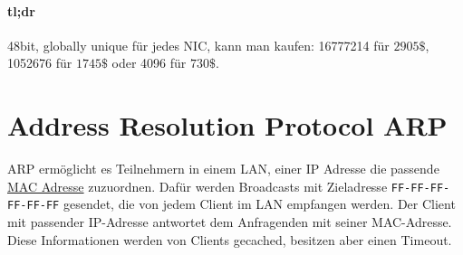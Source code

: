 \paragraph{tl;dr}
48bit, globally unique für jedes NIC, kann man kaufen: 16777214 für $2905\$$, 1052676 für $1745\$$ oder 4096 für $730\$$.

\section{Address Resolution Protocol ARP}
ARP ermöglicht es Teilnehmern in einem LAN, einer IP Adresse die passende \hyperref[sec:mac-address]{MAC Adresse} zuzuordnen. Dafür werden Broadcasts mit Zieladresse \lstinline{FF-FF-FF-FF-FF-FF} gesendet, die von jedem Client im LAN empfangen werden. Der Client mit passender IP-Adresse antwortet dem Anfragenden mit seiner MAC-Adresse. Diese Informationen werden von Clients gecached, besitzen aber einen Timeout.
